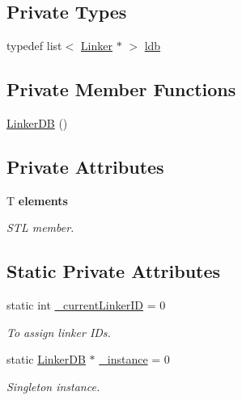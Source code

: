 \subsection*{Private Types}
\begin{DoxyCompactItemize}
\item 
typedef list$<$ \hyperlink{classLinker}{Linker} $\ast$ $>$ \hyperlink{classLinkerDB_ab6e83c50f32e3905892767088cb0f66c}{ldb}
\end{DoxyCompactItemize}
\subsection*{Private Member Functions}
\begin{DoxyCompactItemize}
\item 
\hyperlink{classLinkerDB_a12a3c8a0510103d3205e9855c6e29ae1}{Linker\+D\+B} ()
\end{DoxyCompactItemize}
\subsection*{Private Attributes}
\begin{DoxyCompactItemize}
\item 
T {\bfseries elements}
\begin{DoxyCompactList}\small\item\em S\+T\+L member. \end{DoxyCompactList}\end{DoxyCompactItemize}
\subsection*{Static Private Attributes}
\begin{DoxyCompactItemize}
\item 
static int \hyperlink{classLinkerDB_ac3365b8ccbf9251280c5dc08f6587bc0}{\+\_\+current\+Linker\+I\+D} = 0
\begin{DoxyCompactList}\small\item\em To assign linker I\+Ds. \end{DoxyCompactList}\item 
static \hyperlink{classLinkerDB}{Linker\+D\+B} $\ast$ \hyperlink{classLinkerDB_a72a6f66320366eb8ea8662749bb37a63}{\+\_\+instance} = 0
\begin{DoxyCompactList}\small\item\em Singleton instance. \end{DoxyCompactList}\end{DoxyCompactItemize}


